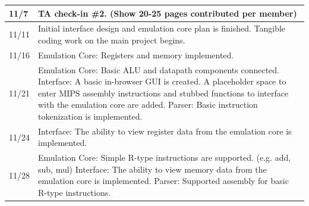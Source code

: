 \documentclass[
    paper=letter,
    parskip=half,
    fontsize=12pt,
    titlepage=firstiscover,
    toc=bibliography,
    numbers=endperiod
]{scrartcl}
\begin{document}
{\begin{tabularx}{\textwidth}{|l|X|}
        11/7          & TA check-in \#2. (Show 20-25 pages contributed per member)                                                                                                                                                                                                                                                                                                                                                                           \\\hline
        11/11         & Initial interface design and emulation core plan is finished. Tangible coding work on the main project begins.                                                                                                                                                                                                                                                                                                                       \\\hline
        11/16         & Emulation Core: Registers and memory implemented.                                                                                                                                                                                                                                                                                                                                                                                    \\\hline
        11/21         & Emulation Core: Basic ALU and datapath components connected. \newline Interface: A basic in-browser GUI is created. A placeholder space to enter MIPS assembly instructions and stubbed functions to interface with the emulation core are added. \newline Parser: Basic instruction tokenization is implemented.                                                                                                                    \\\hline
        11/24         & Interface: The ability to view register data from the emulation core is implemented.                                                                                                                                                                                                                                                                                                                                                 \\\hline
        11/28         & Emulation Core: Simple R-type instructions are supported. (e.g. add, sub, mul) \newline Interface: The ability to view memory data from the emulation core is implemented. \newline Parser: Supported assembly for basic R-type instructions.                                                                                                                                                                                        \\\hline

\end{tabularx}}
\end{document}
